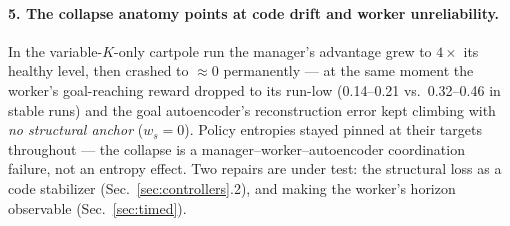 \documentclass[10pt]{article}
\begin{document}
\paragraph{5. The collapse anatomy points at code drift and worker
unreliability.} In the variable-$K$-only cartpole run the manager's advantage
grew to $4\times$ its healthy level, then crashed to $\approx 0$ permanently
--- at the same moment the worker's goal-reaching reward dropped to its run-low
(0.14--0.21 vs.\ 0.32--0.46 in stable runs) and the goal autoencoder's
reconstruction error kept climbing with \emph{no structural anchor}
($w_s{=}0$). Policy entropies stayed pinned at their targets throughout ---
the collapse is a manager--worker--autoencoder coordination failure, not an
entropy effect. Two repairs are under test: the structural loss as a code
stabilizer (Sec.~\ref{sec:controllers}.2), and making the worker's horizon
observable (Sec.~\ref{sec:timed}).
\end{document}

